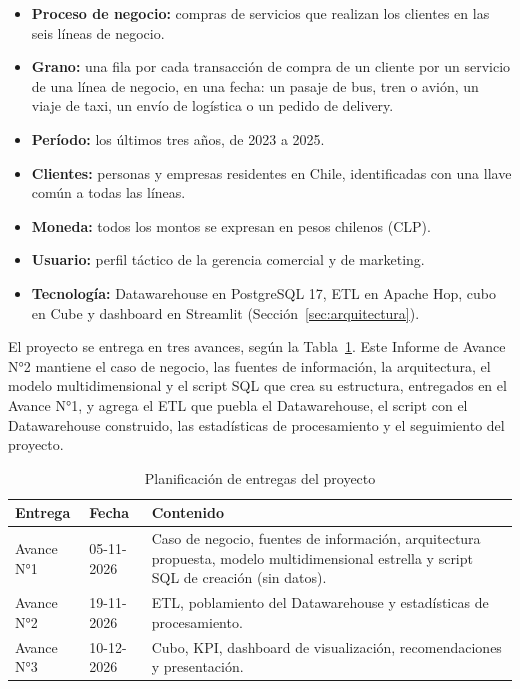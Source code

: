 \begin{itemize}[leftmargin=*]
  \item \textbf{Proceso de negocio:} compras de servicios que realizan los
        clientes en las seis líneas de negocio.
  \item \textbf{Grano:} una fila por cada transacción de compra de un cliente
        por un servicio de una línea de negocio, en una fecha: un pasaje de
        bus, tren o avión, un viaje de taxi, un envío de logística o un pedido
        de delivery.
  \item \textbf{Período:} los últimos tres años, de 2023 a 2025.
  \item \textbf{Clientes:} personas y empresas residentes en Chile,
        identificadas con una llave común a todas las líneas.
  \item \textbf{Moneda:} todos los montos se expresan en pesos chilenos (CLP).
  \item \textbf{Usuario:} perfil táctico de la gerencia comercial y de
        marketing.
  \item \textbf{Tecnología:} Datawarehouse en PostgreSQL 17, ETL en Apache
        Hop, cubo en Cube y dashboard en Streamlit
        (Sección~\ref{sec:arquitectura}).
\end{itemize}

El proyecto se entrega en tres avances, según la
Tabla~\ref{tab:entregas}. Este Informe de Avance N°2 mantiene el caso de
negocio, las fuentes de información, la arquitectura, el modelo
multidimensional y el script SQL que crea su estructura, entregados en el
Avance N°1, y agrega el ETL que puebla el Datawarehouse, el script con el
Datawarehouse construido, las estadísticas de procesamiento y el seguimiento
del proyecto.

\begin{table}[!htbp]
  \centering
  \caption{Planificación de entregas del proyecto}
  \label{tab:entregas}
  \small
  \begin{tabularx}{\linewidth}{@{}llX@{}}
    \toprule
    \textbf{Entrega} & \textbf{Fecha} & \textbf{Contenido} \\
    \midrule
    Avance N°1 & 05-11-2026 & Caso de negocio, fuentes de información,
                              arquitectura propuesta, modelo multidimensional
                              estrella y script SQL de creación (sin datos). \\
    Avance N°2 & 19-11-2026 & ETL, poblamiento del Datawarehouse y
                              estadísticas de procesamiento. \\
    Avance N°3 & 10-12-2026 & Cubo, KPI, dashboard de visualización,
                              recomendaciones y presentación. \\
    \bottomrule
  \end{tabularx}
\end{table}

